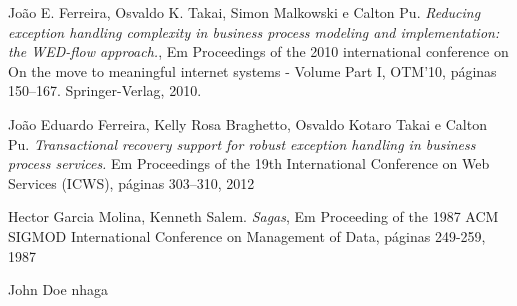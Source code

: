 \documentclass[conference]{IEEEtran}
\begin{document}
%
%
%
\begin{thebibliography}{1}

João E. Ferreira, Osvaldo K. Takai, Simon Malkowski e Calton Pu. 
\emph{Reducing exception handling complexity in business process modeling and implementation:
the WED-flow approach.}, Em Proceedings of the 2010 international conference on
On the move to meaningful internet systems - Volume Part I, OTM’10, páginas
150–167. Springer-Verlag, 2010.

João Eduardo Ferreira, Kelly Rosa Braghetto, Osvaldo Kotaro Takai e
Calton Pu.\emph{ Transactional recovery support for robust exception handling in business process
services.} Em Proceedings of the 19th International Conference on Web Services (ICWS), páginas
303–310, 2012

Hector Garcia Molina, Kenneth Salem.
\emph{Sagas}, Em Proceeding of the 1987 ACM SIGMOD International Conference on Management of Data, páginas 249-259, 1987


\end{thebibliography}

% 

\begin{IEEEbiography}{John Doe}
\blindtext
nhaga
\end{IEEEbiography}
\end{document}
